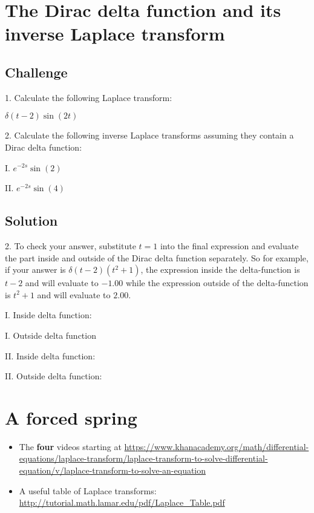 \section{The Dirac delta function and its inverse Laplace transform}

\subsection*{Challenge}
1. Calculate the following Laplace transform:

$\displaystyle \delta(t-2) \sin(2t)$

2. Calculate the following inverse Laplace transforms assuming they contain a Dirac delta function:

I. $\displaystyle e^{-2s} \sin(2)$

II. $\displaystyle e^{-2s} \sin(4)$

\subsection*{Solution}
2. To check your answer, substitute $t=1$ into the final expression and evaluate the part inside and outside of the Dirac delta function separately. So for example, if your answer is $\delta(t-2) (t^2+1)$, the expression inside the delta-function is $t-2$ and will evaluate to $-1.00$ while the expression outside of the delta-function is $t^2+1$ and will evaluate to $2.00$.

I. Inside delta function:\\

I. Outside delta function\\

II. Inside delta function:\\

II. Outside delta function:\\




\newpage
\section{A forced spring}

\begin{itemize}
    \item The \textbf{four} videos starting at \url{https://www.khanacademy.org/math/differential-equations/laplace-transform/laplace-transform-to-solve-differential-equation/v/laplace-transform-to-solve-an-equation}
    \item A useful table of Laplace transforms: \url{http://tutorial.math.lamar.edu/pdf/Laplace_Table.pdf}
\end{itemize}

